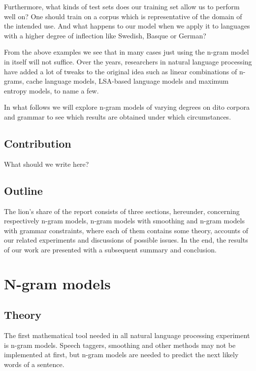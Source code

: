 \documentclass[a4paper,12pt]{article}
\begin{document}
Furthermore, what kinds of test sets does our training set allow us to perform well on? One should train on a  corpus which is representative of the domain of the intended use. And what happens to our model when we apply it to languages with a higher degree of inflection like Swedish, Basque or German?

From the above examples we see that in many cases just using the n-gram model in itself will not suffice. Over the years, researchers in natural language processing have added a lot of tweaks to the original idea such as linear combinations of n-grams, cache language models, LSA-based language models and maximum entropy models, to name a few.

In what follows we will explore n-gram models of varying degrees on dito corpora and grammar to see which results are obtained under which circumstances.

\subsection{Contribution}
What should we write here?

\subsection{Outline}
The lion's share of the report consists of three sections, hereunder, concerning respectively n-gram models, n-gram models with smoothing and n-gram models with grammar constraints, where each of them contains some theory, accounts of our related experiments and discussions of possible issues. In the end, the results of our work are presented with a subsequent summary and conclusion.

\section{N-gram models}
\label{sec:ngram}

\subsection{Theory}
The first mathematical tool needed in all natural language processing experiment is n-gram models. Speech taggers, smoothing and other methods may not be implemented at first, but n-gram models are needed to predict the next likely words of a sentence.
\end{document}
